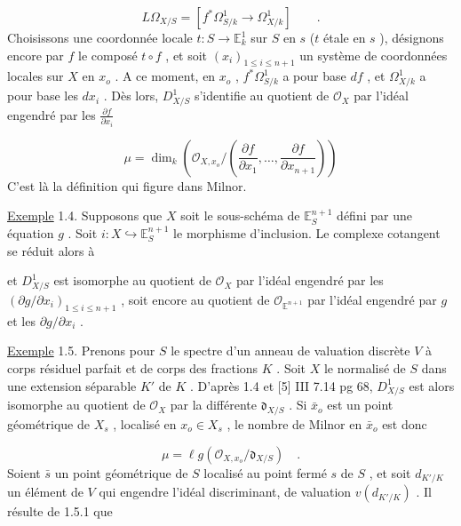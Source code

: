 \begin{equation*}
L\Omega_{X/S} = [f^*\Omega^1_{S/k} \to \Omega^1_{X/k}] \qquad .
\end{equation*}
Choisissons une coordonnée locale $t : S \to \mathbb{E}^1_k$ sur $S$ en $s$ ($t$ étale en $s$ ), désignons encore par $f$ le composé $t \circ f$ , et soit $(x_i)_{1 \leq i \leq n+1}$ un système de coordonnées locales sur $X$ en $x_o$ . A ce moment, en $x_o$ , $f^*\Omega^1_{S/k}$ a pour base $df$ , et $\Omega^1_{X/k}$ a pour base les $dx_i$ . Dès lors, $D^1_{X/S}$ s'identifie au quotient de $\mathcal{O}_X$ par l'idéal engendré par les $\frac{\partial f}{\partial x_i}$

\begin{equation}\tag{1.3.1}
\mu = \dim_k(\mathcal{O}_{X,x_o}/(\frac{\partial f}{\partial x_1},\ldots,\frac{\partial f}{\partial x_{n+1}}))
\end{equation}
C'est là la définition qui figure dans Milnor.

\underline{Exemple} 1.4. Supposons que $X$ soit le sous-schéma de $\mathbb{E}^{n+1}_S$ défini par une équation $g$ . Soit $i : X \hookrightarrow \mathbb{E}^{n+1}_S$ le morphisme d'inclusion. Le complexe cotangent se réduit alors à

\begin{equation*}
[(g)/(g)^2 \longrightarrow i^*\Omega^1_{\mathbb{E}^{n+1}/S}]
\end{equation*}
et $D^1_{X/S}$ est isomorphe au quotient de $\mathcal{O}_X$ par l'idéal engendré par les $(\partial g/\partial x_i)_{1 \leq i \leq n+1}$ , soit encore au quotient de $\mathcal{O}_{\mathbb{E}^{n+1}}$ par l'idéal engendré par $g$ et les $\partial g/\partial x_i$ .

\underline{Exemple} 1.5. Prenons pour $S$ le spectre d'un anneau de valuation discrète $V$ à corps résiduel parfait et de corps des fractions $K$ . Soit $X$ le normalisé de $S$
dans une extension séparable $K'$ de $K$ . D'après 1.4 et [5] III 7.14 pg 68, $D^1_{X/S}$ est alors isomorphe au quotient de $\mathcal{O}_X$ par la différente $\mathfrak{d}_{X/S}$ . Si $\bar{x}_o$ est un point géométrique de $X_s$ , localisé en $x_o \in X_s$ , le nombre de Milnor en $\bar{x}_o$ est donc

\begin{equation}\tag{1.5.1}
\mu = \ell g(\mathcal{O}_{X,x_o}/\mathfrak{d}_{X/S}) \quad .
\end{equation}
Soient $\bar{s}$ un point géométrique de $S$ localisé au point fermé $s$ de $S$ , et soit $d_{K'/K}$ un élément de $V$ qui engendre l'idéal discriminant, de valuation $v(d_{K'/K})$ . Il résulte de 1.5.1 que

